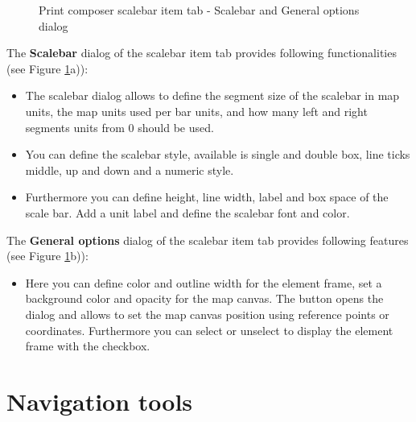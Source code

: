 \begin{figure}[ht]
\centering
{}
\hspace{1cm}
\caption{Print composer scalebar item tab - Scalebar and General options dialog \nixcaption}\label{fig:scalebaroptions}
\end{figure}


The \textbf{Scalebar} dialog of the scalebar item tab provides following
functionalities (see Figure \ref{fig:scalebaroptions}a)):

\begin{itemize}[label=--]
\item The scalebar dialog allows to define the segment size of the scalebar
in map units, the map units used per bar units, and how many left and right
segments units from 0 should be used.
\item You can define the scalebar style, available is single and double box,
line ticks middle, up and down and a numeric style.
\item Furthermore you can define height, line width, label and box space of
the scale bar. Add a unit label and define the scalebar font and color.
\end{itemize}


The \textbf{General options} dialog of the scalebar item tab provides following
features (see Figure \ref{fig:scalebaroptions}b)):

\begin{itemize}[label=--]
\item Here you can define color and outline width for the element frame, set
a background color and opacity for the map canvas. The 
button opens the  dialog and allows to set the map
canvas position using reference points or coordinates. Furthermore you can
select or unselect to display the element frame with the  checkbox.
\end{itemize}

\section{Navigation tools}

